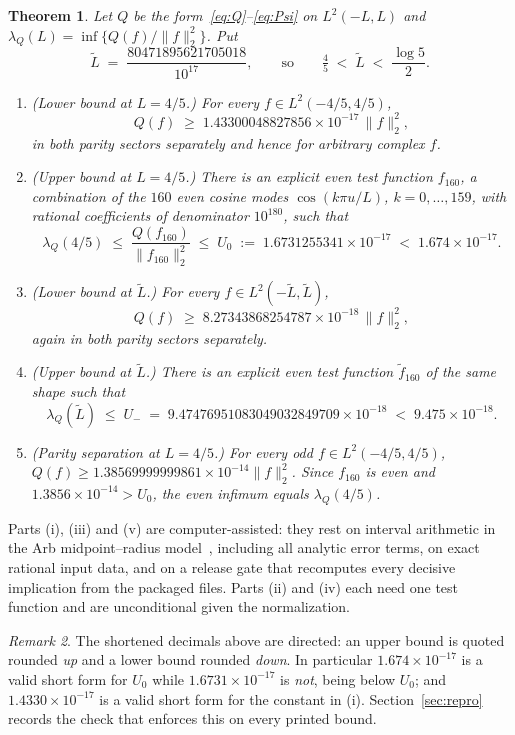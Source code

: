 \documentclass[11pt,a4paper]{article}
\newtheorem{theorem}{Theorem}
\theoremstyle{definition}
\theoremstyle{remark}
\newtheorem{remark}[theorem]{Remark}
\newcommand{\lQ}{\lambda_{Q}}
\begin{document}
\begin{theorem}
\label{thm:main}
Let $Q$ be the form~\eqref{eq:Q}--\eqref{eq:Psi} on $L^2(-L,L)$ and
$\lQ(L) = \inf\{Q(f)/\|f\|_2^2\}$. Put
\[
   \widetilde L \;=\; \frac{80471895621705018}{10^{17}} ,
   \qquad\text{so}\qquad \tfrac45 \;<\; \widetilde L \;<\; \frac{\log 5}{2} .
\]
\begin{enumerate}
\item[(i)] \emph{(Lower bound at $L = 4/5$.)} For every
  $f \in L^2(-4/5,4/5)$,
  \[
     Q(f) \;\ge\; 1.43300048827856\times 10^{-17}\, \|f\|_2^2 ,
  \]
  in both parity sectors separately and hence for arbitrary complex $f$.
\item[(ii)] \emph{(Upper bound at $L = 4/5$.)} There is an explicit even test
  function $f_{160}$, a combination of the $160$ even cosine modes
  $\cos(k\pi u/L)$, $k = 0,\dots,159$, with rational coefficients of
  denominator $10^{180}$, such that
  \[
     \lQ(4/5) \;\le\; \frac{Q(f_{160})}{\|f_{160}\|_2^2}
     \;\le\; U_0 \;:=\; 1.6731255341\times10^{-17}
     \;<\; 1.674\times10^{-17}.
  \]
\item[(iii)] \emph{(Lower bound at $\widetilde L$.)} For every
  $f \in L^2(-\widetilde L,\widetilde L)$,
  \[
     Q(f) \;\ge\; 8.27343868254787\times 10^{-18}\, \|f\|_2^2 ,
  \]
  again in both parity sectors separately.
\item[(iv)] \emph{(Upper bound at $\widetilde L$.)} There is an explicit even
  test function $\widetilde f_{160}$ of the same shape such that
  \[
     \lQ(\widetilde L) \;\le\; U_- \;=\;
     9.47476951083049032849709\times10^{-18} \;<\; 9.475\times10^{-18}.
  \]
\item[(v)] \emph{(Parity separation at $L = 4/5$.)} For every odd
  $f \in L^2(-4/5,4/5)$,
  $Q(f) \ge 1.38569999999861\times10^{-14}\|f\|_2^2$. Since $f_{160}$ is even
  and $1.3856\times10^{-14} > U_0$, the even infimum equals $\lQ(4/5)$.
\end{enumerate}
\end{theorem}

Parts (i), (iii) and (v) are computer-assisted: they rest on interval arithmetic
in the Arb midpoint--radius model~\cite{Arb}, including all analytic error
terms, on exact rational input data, and on a release gate that recomputes every
decisive implication from the packaged files. Parts (ii) and (iv) each need one
test function and are unconditional given the normalization.

\begin{remark}
The shortened decimals above are directed: an upper bound is quoted rounded
\emph{up} and a lower bound rounded \emph{down}. In particular
$1.674\times10^{-17}$ is a valid short form for $U_0$ while
$1.6731\times10^{-17}$ is \emph{not}, being below $U_0$; and $1.4330\times
10^{-17}$ is a valid short form for the constant in (i). Section~\ref{sec:repro}
records the check that enforces this on every printed bound.
\end{remark}
\end{document}
